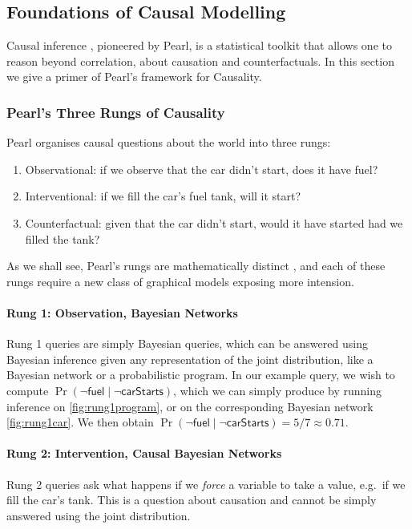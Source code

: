 \documentclass[11pt,a4paper]{article}
\begin{document}
\subsection{Foundations of Causal Modelling}\label{sec:causal}

Causal inference \cite{pearl2009causality,Pearl2018_book_of_why}, pioneered by Pearl, is a statistical toolkit that allows one to reason beyond correlation, about causation and counterfactuals. In this section we give a primer of Pearl's framework for Causality. 

\subsubsection{Pearl's Three Rungs of Causality}\label{sec:rungs}

Pearl \cite{Pearl2018_book_of_why} organises causal questions about the world into three rungs:
\begin{enumerate}
    \item Observational: if we observe that the car didn't start, does it have fuel?
    \item Interventional: if we fill the car's fuel tank, will it start? 
    \item Counterfactual: given that the car didn't start, would it have started had we filled the tank? 
\end{enumerate}
As we shall see, Pearl's rungs are mathematically distinct \cite{pearl2009causality}, and each of these rungs require a new class of graphical models exposing more intension. 

\paragraph{Rung 1: Observation, Bayesian Networks} 
Rung 1 queries are simply Bayesian queries, which can be answered using Bayesian inference given any representation of the joint distribution, like a Bayesian network or a probabilistic program. In our example query, we wish to compute $\Pr(\neg \mathsf{fuel} \mid \neg \mathsf{carStarts})$, which we can simply produce by running inference on \cref{fig:rung1program}, or on the corresponding Bayesian network \cref{fig:rung1car}. We then obtain $\Pr(\neg \mathsf{fuel} \mid \neg \mathsf{carStarts}) = 5/7 \approx 0.71$. 

\paragraph{Rung 2: Intervention, Causal Bayesian Networks} Rung 2 queries ask what happens if we \emph{force} a variable to take a value, e.g.\ if we fill the car's tank. This is a question about causation and cannot be simply answered using the joint distribution. 
\end{document}
